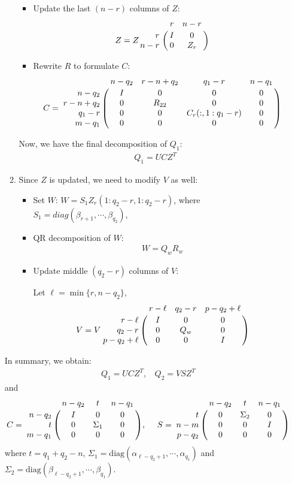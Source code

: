 \begin{enumerate}
\begin{enumerate}
\begin{itemize}
\item Update the last $(n-r)$ columns of $Z$:
\begin{displaymath}
Z = Z\bordermatrix{ & r & n-r \cr
\hfill r & I & 0 \cr
\hfill n-r & 0 & Z_{r}}
\end{displaymath}

\item Rewrite $R$ to formulate $C$:
\begin{displaymath}
C = \bordermatrix{ & n-q_2 & r-n+q_2 & q_1-r & n-q_1 \cr
\hfill n-q_2 & I & 0 & 0 & 0 \cr
\hfill r-n+q_2 & 0 & R_{22} & 0 & 0 \cr
\hfill q_1-r & 0 & 0 & C_{r}(:,1:q_1-r) & 0 \cr
\hfill m-q_1 & 0 & 0 & 0 & 0}
\end{displaymath}
\end{itemize}
Now, we have the final decomposition of $Q_1$:
\begin{align}
Q_1 = UCZ^{T}
\end{align}

\item Since $Z$ is updated, we need to modify $V$ as well:
\begin{itemize}
\item Set $W$: $W = S_1Z_{r}(1:q_2-r,1:q_2-r)$, where
$S_1 = diag(\beta_{r+1}, \cdots, \beta_{q_2})$, 

\item QR decomposition of $W$:
\begin{align}
W = Q_{w}R_{w}
\end{align}

\item Update middle $(q_2-r)$ columns of $V$:
                            
Let $\ell = \min\{r, n-q_2\}$,
\begin{displaymath}
V = V\bordermatrix{ & r-\ell & q_2-r & p-q_2+\ell \cr
\hfill r-\ell & I & 0 & 0 \cr
\hfill q_2-r & 0 & Q_{w} & 0 \cr
\hfill p-q_2+\ell & 0 & 0 & I}
\end{displaymath}
\end{itemize}

\end{enumerate}
In summary, we obtain:
\begin{align}
Q_1 = UCZ^{T}, \ \ \ \ Q_2 = VSZ^{T}
\end{align}
and
\begin{displaymath}
C = \bordermatrix{ & n-q_2 & t & n-q_1 \cr
                \hfill n-q_2 & I & 0 & 0 \cr
                \hfill t & 0 & \Sigma_1 & 0 \cr
                \hfill m-q_1 & 0 & 0 & 0}, \  \ \ \
S = \bordermatrix{ & n-q_2 & t & n-q_1 \cr
                \hfill t & 0 & \Sigma_2 & 0 \cr
                \hfill n-m & 0 & 0 & I \cr
                \hfill p-q_2 & 0 & 0 & 0}
\end{displaymath}
where $t = q_1 + q_2 - n$, 
$\Sigma_1 = \mbox{diag}(\alpha_{\ell-q_2+1}, \cdots, \alpha_{q_1})$ and 
$\Sigma_2 = \mbox{diag}(\beta_{\ell-q_2+1}, \cdots, \beta_{q_1})$.
        

\end{enumerate}
